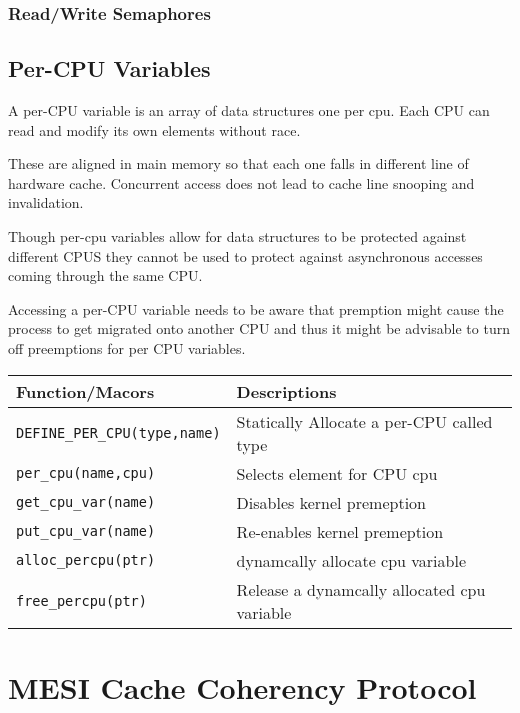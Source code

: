 \documentclass{article}
\begin{document}
\subsubsection{Read/Write Semaphores}



\subsection{Per-CPU Variables}

A per-CPU variable is an array of data structures one per cpu. Each CPU
can read and modify its own elements without race.

These are aligned in main memory so that each one falls in different
line of hardware cache. Concurrent access does not lead to cache line
snooping and invalidation.

Though per-cpu variables allow for data structures to be protected
against different CPUS they cannot be used to protect against
asynchronous accesses coming through the same CPU.

Accessing a per-CPU variable needs to be aware that premption might
cause the process to get migrated onto another CPU and thus it might
be advisable to turn off preemptions for per CPU variables.


\begin{center}
  \begin{tabular}{ l | l }
    
    \hline
    Function/Macors & Descriptions \\ \hline
    \lstinline{DEFINE_PER_CPU(type,name)} & Statically Allocate a per-CPU called type \\ 
    \lstinline{per_cpu(name,cpu)} & Selects element for CPU cpu \\ 
    \lstinline{get_cpu_var(name)} &  Disables kernel premeption \\
    \lstinline{put_cpu_var(name)} &  Re-enables kernel premeption \\
    \lstinline{alloc_percpu(ptr)} &  dynamcally allocate cpu variable \\
    \lstinline{free_percpu(ptr)} &  Release a dynamcally allocated cpu variable \\
    \hline
  \end{tabular}
\end{center}

\section{MESI Cache Coherency Protocol}
\end{document}
